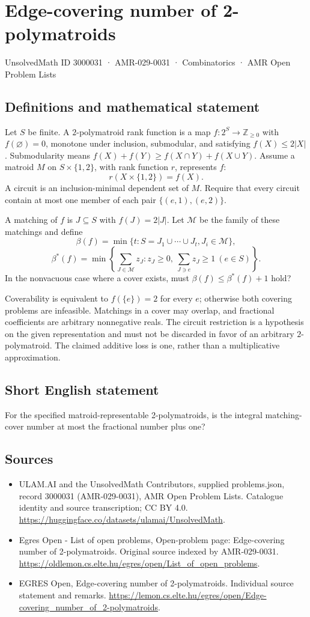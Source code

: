 \documentclass[11pt,a4paper]{article}
\begin{document}
\section*{Edge-covering number of 2-polymatroids}\label{3000031}
{\small UnsolvedMath ID 3000031 · AMR-029-0031 · Combinatorics · AMR Open Problem Lists}
\subsection{Definitions and mathematical statement}
Let $S$ be finite. A $2$-polymatroid rank function is a map
$f:2^S\to\mathbb Z_{\ge0}$ with $f(\varnothing)=0$, monotone under
inclusion, submodular, and satisfying $f(X)\le2|X|$. Submodularity means
$f(X)+f(Y)\ge f(X\cap Y)+f(X\cup Y)$.
Assume a matroid $M$ on $S\times\{1,2\}$, with rank function $r$,
represents $f$:
\[
                    r(X\times\{1,2\})=f(X).
\]
A circuit is an inclusion-minimal dependent set of $M$. Require that
every circuit contain at most one member of each pair
$\{(e,1),(e,2)\}$.

A matching of $f$ is $J\subseteq S$ with $f(J)=2|J|$.
Let $\mathcal M$ be the family of these matchings and define
\[
 \beta(f)=\min\{t:S=J_1\cup\cdots\cup J_t, J_i\in\mathcal M\},
\]
\[
 \beta^*(f)=\min\left\{\sum_{J\in\mathcal M}z_J:
 z_J\ge0,\ \sum_{J\ni e}z_J\ge1\ (e\in S)\right\}.
\]
In the nonvacuous case where a cover exists, must
$\beta(f)\le\beta^*(f)+1$ hold?

Coverability is equivalent to $f(\{e\})=2$ for every $e$; otherwise
both covering problems are infeasible. Matchings in a cover may overlap,
and fractional coefficients are arbitrary nonnegative reals. The
circuit restriction is a hypothesis on the given representation and
must not be discarded in favor of an arbitrary $2$-polymatroid. The
claimed additive loss is one, rather than a multiplicative approximation.
\subsection{Short English statement}
For the specified matroid-representable 2-polymatroids, is the integral matching-cover number at most the fractional number plus one?
\subsection{Sources}
\begin{itemize}
\item[S1] ULAM.AI and the UnsolvedMath Contributors, supplied problems.json, record 3000031 (AMR-029-0031), AMR Open Problem Lists. Catalogue identity and source transcription; CC BY 4.0.
\url{https://huggingface.co/datasets/ulamai/UnsolvedMath}.
\item[S2] Egres Open - List of open problems, Open-problem page: Edge-covering number of 2-polymatroids. Original source indexed by AMR-029-0031.
\url{https://oldlemon.cs.elte.hu/egres/open/List_of_open_problems}.
\item[S3] EGRES Open, Edge-covering number of 2-polymatroids. Individual source statement and remarks.
\url{https://lemon.cs.elte.hu/egres/open/Edge-covering_number_of_2-polymatroids}.
\end{itemize}
\end{document}
